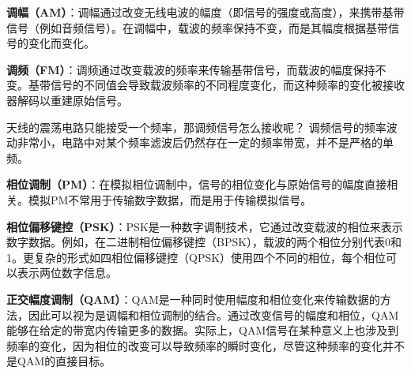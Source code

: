
\textbf{调幅（AM）}：调幅通过改变无线电波的幅度（即信号的强度或高度），来携带基带信号（例如音频信号）。在调幅中，载波的频率保持不变，而是其幅度根据基带信号的变化而变化。

\textbf{调频（FM）}：调频通过改变载波的频率来传输基带信号，而载波的幅度保持不变。基带信号的不同值会导致载波频率的不同程度变化，而这种频率的变化被接收器解码以重建原始信号。

天线的震荡电路只能接受一个频率，那调频信号怎么接收呢？ 调频信号的频率波动非常小，电路中对某个频率滤波后仍然存在一定的频率带宽，并不是严格的单频。

\textbf{相位调制（PM）}：在模拟相位调制中，信号的相位变化与原始信号的幅度直接相关。模拟PM不常用于传输数字数据，而是用于传输模拟信号。

\textbf{相位偏移键控（PSK）}：PSK是一种数字调制技术，它通过改变载波的相位来表示数字数据。例如，在二进制相位偏移键控（BPSK），载波的两个相位分别代表0和1。更复杂的形式如四相位偏移键控（QPSK）使用四个不同的相位，每个相位可以表示两位数字信息。

\textbf{正交幅度调制（QAM）}：QAM是一种同时使用幅度和相位变化来传输数据的方法，因此可以视为是调幅和相位调制的结合。通过改变信号的幅度和相位，QAM能够在给定的带宽内传输更多的数据。实际上，QAM信号在某种意义上也涉及到频率的变化，因为相位的改变可以导致频率的瞬时变化，尽管这种频率的变化并不是QAM的直接目标。
